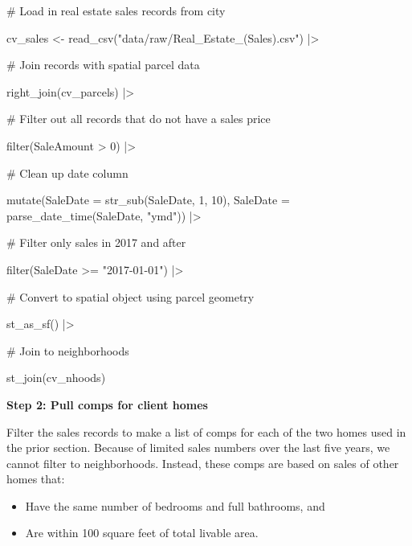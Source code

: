 \documentclass[
  letterpaper,
  DIV=11,
  numbers=noendperiod]{scrartcl}
\newenvironment{Shaded}{\begin{snugshade}}{\end{snugshade}}
\newcommand{\AttributeTok}[1]{\textcolor[rgb]{0.40,0.45,0.13}{#1}}
\newcommand{\CommentTok}[1]{\textcolor[rgb]{0.37,0.37,0.37}{#1}}
\newcommand{\DecValTok}[1]{\textcolor[rgb]{0.68,0.00,0.00}{#1}}
\newcommand{\FunctionTok}[1]{\textcolor[rgb]{0.28,0.35,0.67}{#1}}
\newcommand{\NormalTok}[1]{\textcolor[rgb]{0.00,0.23,0.31}{#1}}
\newcommand{\OtherTok}[1]{\textcolor[rgb]{0.00,0.23,0.31}{#1}}
\newcommand{\SpecialCharTok}[1]{\textcolor[rgb]{0.37,0.37,0.37}{#1}}
\newcommand{\StringTok}[1]{\textcolor[rgb]{0.13,0.47,0.30}{#1}}
\providecommand{\tightlist}{%
  \setlength{\itemsep}{0pt}\setlength{\parskip}{0pt}}\usepackage{longtable,booktabs,array}
\begin{document}
\begin{Shaded}
\begin{Highlighting}[]
\CommentTok{\# Load in real estate sales records from city}

\NormalTok{cv\_sales }\OtherTok{\textless{}{-}} \FunctionTok{read\_csv}\NormalTok{(}\StringTok{"data/raw/Real\_Estate\_(Sales).csv"}\NormalTok{) }\SpecialCharTok{|\textgreater{}} 
  
  \CommentTok{\# Join records with spatial parcel data}
  
  \FunctionTok{right\_join}\NormalTok{(cv\_parcels) }\SpecialCharTok{|\textgreater{}} 
  
  \CommentTok{\# Filter out all records that do not have a sales price}
  
  \FunctionTok{filter}\NormalTok{(SaleAmount }\SpecialCharTok{\textgreater{}} \DecValTok{0}\NormalTok{) }\SpecialCharTok{|\textgreater{}} 
  
  \CommentTok{\# Clean up date column}
  
  \FunctionTok{mutate}\NormalTok{(}\AttributeTok{SaleDate =} \FunctionTok{str\_sub}\NormalTok{(SaleDate, }\DecValTok{1}\NormalTok{, }\DecValTok{10}\NormalTok{),}
         \AttributeTok{SaleDate =} \FunctionTok{parse\_date\_time}\NormalTok{(SaleDate, }\StringTok{"ymd"}\NormalTok{)) }\SpecialCharTok{|\textgreater{}}
  
  \CommentTok{\# Filter only sales in 2017 and after}
  
  \FunctionTok{filter}\NormalTok{(SaleDate }\SpecialCharTok{\textgreater{}=} \StringTok{"2017{-}01{-}01"}\NormalTok{) }\SpecialCharTok{|\textgreater{}} 
  
  \CommentTok{\# Convert to spatial object using parcel geometry}
  
  \FunctionTok{st\_as\_sf}\NormalTok{() }\SpecialCharTok{|\textgreater{}} 
  
  \CommentTok{\# Join to neighborhoods}
  
  \FunctionTok{st\_join}\NormalTok{(cv\_nhoods)}
\end{Highlighting}
\end{Shaded}

\textbf{Step 2: Pull comps for client homes}

Filter the sales records to make a list of comps for each of the two
homes used in the prior section. Because of limited sales numbers over
the last five years, we cannot filter to neighborhoods. Instead, these
comps are based on sales of other homes that:

\begin{itemize}
\tightlist
\item
  Have the same number of bedrooms and full bathrooms, and
\item
  Are within 100 square feet of total livable area.
\end{itemize}
\end{document}
